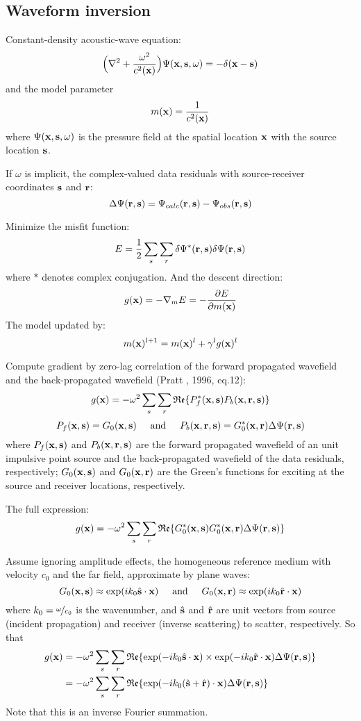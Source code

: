 \subsection{Waveform inversion}
Constant-density acoustic-wave equation:
\[ \Big(\nabla^2+\frac{\omega^2}{c^2(\mathbf{x})}\Big)\Psi(\mathbf{x},\mathbf{s},\omega)=-\delta(\mathbf{x}-\mathbf{s}) \]
and the model parameter
\[ m(\mathbf{x})=\frac{1}{c^2(\mathbf{x})} \]
where $\Psi(\mathbf{x},\mathbf{s},\omega)$ is the pressure field at the spatial location $\mathbf{x}$ with the source location $\mathbf{s}$.\par
If $\omega$ is implicit, the complex-valued data residuals with source-receiver coordinates $\mathbf{s}$ and $\mathbf{r}$:
\[ \Delta\Psi(\mathbf{r},\mathbf{s})=\Psi_{calc}(\mathbf{r},\mathbf{s})-\Psi_{obs}(\mathbf{r},\mathbf{s}) \]\par
Minimize the misfit function:
\[ E=\frac{1}{2}\sum_s\sum_r\delta\Psi^*(\mathbf{r},\mathbf{s})\delta\Psi(\mathbf{r},\mathbf{s}) \]
where $*$ denotes complex conjugation. And the descent direction:
\[ g(\mathbf{x})=-\nabla_m E=-\frac{\partial E}{\partial m(\mathbf{x})} \]
The model updated by:
\[ m(\mathbf{x})^{l+1}=m(\mathbf{x})^l+\gamma^lg(\mathbf{x})^l \]\par
Compute gradient by zero-lag correlation of the forward propagated wavefield and the back-propagated wavefield (Pratt \etal, 1996, eq.12):
\[ g(\mathbf{x})=-\omega^2\sum_s\sum_r\mathfrak{Re}\{P_f^*(\mathbf{x},\mathbf{s})P_b(\mathbf{x},\mathbf{r},\mathbf{s})\} \]
\[ P_f(\mathbf{x},\mathbf{s})=G_0(\mathbf{x},\mathbf{s}) \text{\hspace{5mm}and\hspace{5mm}} P_b(\mathbf{x},\mathbf{r},\mathbf{s})=G_0^*(\mathbf{x},\mathbf{r})\Delta\Psi(\mathbf{r},\mathbf{s}) \]
where $P_f(\mathbf{x},\mathbf{s})$ and $P_b(\mathbf{x},\mathbf{r},\mathbf{s})$ are the forward propagated wavefield of an unit impulsive point source and the back-propagated wavefield of the data residuals, respectively; $G_0(\mathbf{x},\mathbf{s})$ and $G_0(\mathbf{x},\mathbf{r})$ are the Green's functions for exciting at the source and receiver locations, respectively.\par
The full expression:
\[ g(\mathbf{x})=-\omega^2\sum_s\sum_r\mathfrak{Re}\{G_0^*(\mathbf{x},\mathbf{s})G_0^*(\mathbf{x},\mathbf{r})\Delta\Psi(\mathbf{r},\mathbf{s})\} \]\par
Assume ignoring amplitude effects, the homogeneous reference medium with velocity $c_0$ and the far field, approximate by plane waves:
\[ G_0(\mathbf{x},\mathbf{s})\approx\exp(ik_0\hat{\mathbf{s}}\cdot\mathbf{x}) \text{\hspace{5mm}and\hspace{5mm}} G_0(\mathbf{x},\mathbf{r})\approx\exp(ik_0\hat{\mathbf{r}}\cdot\mathbf{x}) \]
where $k_0=\nicefrac{\omega}{c_0}$ is the wavenumber, and $\hat{\mathbf{s}}$ and $\hat{\mathbf{r}}$ are unit vectors from source (incident propagation) and receiver (inverse scattering) to scatter, respectively. So that
\begin{align*}
g(\mathbf{x}) & =-\omega^2\sum_s\sum_r\mathfrak{Re}\{\exp(-ik_0\hat{\mathbf{s}}\cdot\mathbf{x})\times\exp(-ik_0\hat{\mathbf{r}}\cdot\mathbf{x})\Delta\Psi(\mathbf{r},\mathbf{s})\} \\
          & =-\omega^2\sum_s\sum_r\mathfrak{Re}\{\exp(-ik_0(\hat{\mathbf{s}}+\hat{\mathbf{r}})\cdot\mathbf{x})\Delta\Psi(\mathbf{r},\mathbf{s})\}
\end{align*}
Note that this is an inverse Fourier summation.\par
